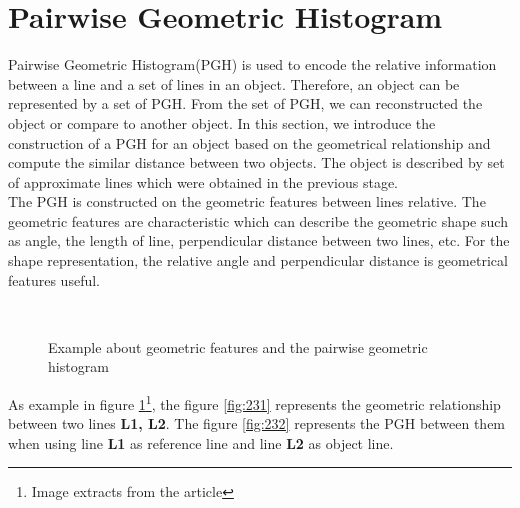 \section{Pairwise Geometric Histogram}
Pairwise Geometric Histogram(PGH)\cite{evans1993use} is used to encode the relative information between a line and a set of lines in an object. Therefore, an object can be represented by a set of PGH. From the set of PGH, we can reconstructed the object or compare to another object. In this section, we introduce the construction of a PGH for an object based on the geometrical relationship and compute the similar distance between two objects. The object is described by set of approximate lines which were obtained in the previous stage.\\
The PGH is constructed on the geometric features between lines relative. The geometric features are characteristic which can describe the geometric shape such as angle, the length of line, perpendicular distance between two lines, etc. For the shape representation, the relative angle and perpendicular distance is geometrical features useful.\\
\begin{figure}[h!]
\centering
{}~~
\caption{Example about geometric features and the pairwise geometric histogram}
\label{fig:figure_23}
\end{figure}
As example in figure \ref{fig:figure_23}\footnote{Image extracts from the article}, the figure \ref{fig:231} represents the geometric relationship between two lines \textbf{L1, L2}. The figure \ref{fig:232} represents the PGH between them when using line \textbf{L1} as reference line and line \textbf{L2} as object line.
